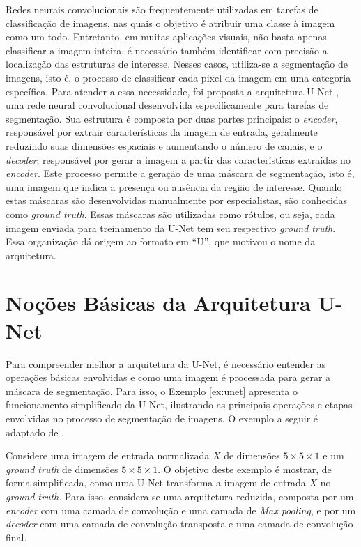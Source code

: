 Redes neurais convolucionais são frequentemente utilizadas em tarefas de classificação de imagens, nas quais o objetivo é atribuir uma classe à imagem como um todo. Entretanto, em muitas aplicações visuais, não basta apenas classificar a imagem inteira, é necessário também identificar com precisão a localização das estruturas de interesse. Nesses casos, utiliza-se a segmentação de imagens, isto é, o processo de classificar cada pixel da imagem em uma categoria específica. Para atender a essa necessidade, foi proposta a arquitetura U-Net \cite{Ronneberger2015UNet}, uma rede neural convolucional desenvolvida especificamente para tarefas de segmentação. Sua estrutura é composta por duas partes principais: o \textit{encoder}, responsável por extrair características da imagem de entrada, geralmente reduzindo suas dimensões espaciais e aumentando o número de canais, e o \textit{decoder}, responsável por gerar a imagem a partir das características extraídas no \textit{encoder}. Este processo permite a geração de uma máscara de segmentação, isto é, uma imagem que indica a presença ou ausência da região de interesse. Quando estas máscaras são desenvolvidas manualmente por especialistas, são conhecidas como \textit{ground truth}. Essas máscaras são utilizadas como rótulos, ou seja, cada imagem enviada para treinamento da U-Net tem seu respectivo \textit{ground truth}. Essa organização dá origem ao formato em “U”, que motivou o nome da arquitetura.


\section{Noções Básicas da Arquitetura U-Net}
\label{sec:unet}
Para compreender melhor a arquitetura da U-Net, é necessário entender as operações básicas envolvidas e como uma imagem é processada para gerar a máscara de segmentação. Para isso, o Exemplo \ref{ex:unet} apresenta o funcionamento simplificado da U-Net, ilustrando as principais operações e etapas envolvidas no processo de segmentação de imagens.
O exemplo a seguir é adaptado de .

\begin{exemplo}
    \label{ex:unet}
    Considere uma imagem de entrada normalizada $X$ de dimensões $5\times 5 \times 1$ e um \textit{ground truth} de dimensões $5\times 5 \times 1$. O objetivo deste exemplo é mostrar, de forma simplificada, como uma U-Net transforma a imagem de entrada $X$ no \textit{ground truth}. Para isso, considera-se uma arquitetura reduzida, composta por um \textit{encoder} com uma camada de convolução e uma camada de \textit{Max pooling}, e por um \textit{decoder} com uma camada de convolução transposta e uma camada de convolução final.
\end{exemplo}

